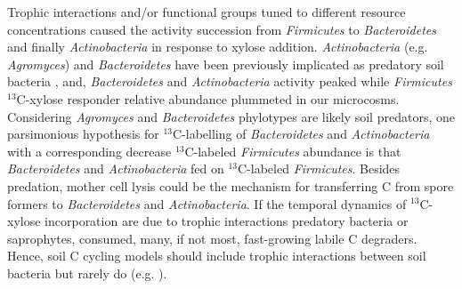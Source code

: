 Trophic interactions and/or functional groups tuned to different resource
concentrations caused the activity succession from \textit{Firmicutes} to
\textit{Bacteroidetes} and finally \textit{Actinobacteria} in response to
xylose addition. \textit{Actinobacteria} (e.g. \textit{Agromyces}) and
\textit{Bacteroidetes} have been previously implicated as predatory soil
bacteria \citep{Lueders2006,16346402}, and, \textit{Bacteroidetes} and
\textit{Actinobacteria} activity peaked while \textit{Firmicutes}
$^{13}$C-xylose responder relative abundance plummeted in our microcosms.
Considering \textit{Agromyces} and \textit{Bacteroidetes} phylotypes are likely
soil predators, one parsimonious hypothesis for $^{13}$C-labelling of
\textit{Bacteroidetes} and \textit{Actinobacteria} with a corresponding
decrease $^{13}$C-labeled \textit{Firmicutes} abundance is that
\textit{Bacteroidetes} and \textit{Actinobacteria} fed on $^{13}$C-labeled
\textit{Firmicutes}. Besides predation, mother cell lysis could be the
mechanism for transferring C from spore formers to \textit{Bacteroidetes} and
\textit{Actinobacteria}. If the temporal dynamics of $^{13}$C-xylose
incorporation are due to trophic interactions predatory bacteria or
saprophytes, consumed, many, if not most, fast-growing labile C degraders.
Hence, soil C cycling models should include trophic interactions between soil
bacteria but rarely do (e.g. \citep{Moore1988}).

